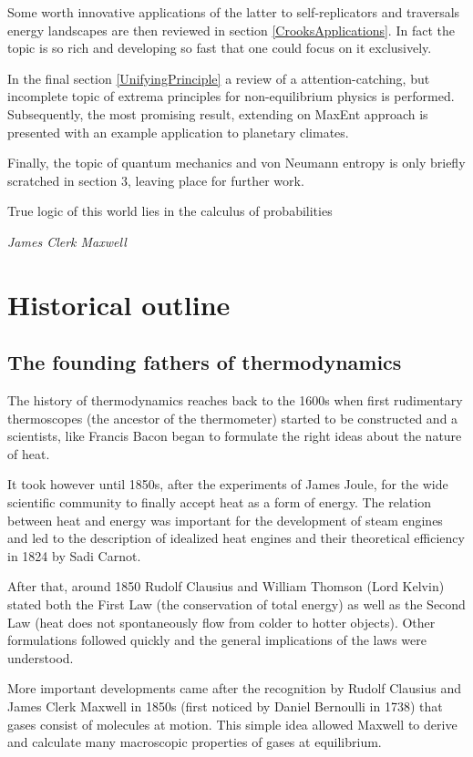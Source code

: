 \documentclass[a4paper,12pt]{article}
\begin{document}
Some worth innovative applications of the latter to self-replicators and traversals energy landscapes are then reviewed in section \ref{CrooksApplications}. In fact the topic is so rich and developing so fast that one could focus on it exclusively. 

In the final section \ref{UnifyingPrinciple} a review of a attention-catching, but incomplete topic of extrema principles for non-equilibrium physics is performed. Subsequently, the most promising result, extending on MaxEnt approach is presented with an example application to planetary climates.

Finally, the topic of quantum mechanics and von Neumann entropy is only briefly scratched in section 3, leaving place for further work.


\newpage
\epigraph{True logic of this world lies in the calculus of probabilities}{\textit{James Clerk Maxwell}}
\section{Historical outline}
\subsection{The founding fathers of thermodynamics}
The history of thermodynamics reaches back to the 1600s when first rudimentary thermoscopes (the ancestor of the thermometer) started to be constructed and a scientists, like Francis Bacon began to formulate the right ideas about the nature of heat. 

It took however until 1850s, after the experiments of James Joule, for the wide scientific community to finally accept heat as a form of energy. The relation between heat and energy was important for the development of steam engines and led to the description of idealized heat engines and their theoretical efficiency in 1824 by Sadi Carnot. 

After that, around 1850 Rudolf Clausius and William Thomson (Lord Kelvin) stated both the First Law (the conservation of total energy) as well as the Second Law (heat does not spontaneously flow from colder to hotter objects). Other formulations followed quickly and the general implications of the laws were understood. 

More important developments came after the recognition by Rudolf Clausius and James Clerk Maxwell in 1850s (first noticed by Daniel Bernoulli in 1738) that gases consist of molecules at motion. This simple idea allowed Maxwell to derive and calculate many macroscopic properties of gases at equilibrium. 
\end{document}
